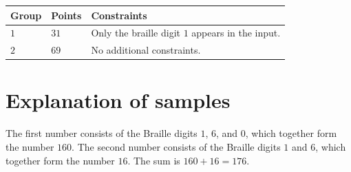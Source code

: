 \noindent
\begin{tabular}{| l | l | p{12cm} |}
  \hline
  \textbf{Group} & \textbf{Points} & \textbf{Constraints} \\ \hline
  $1$    & $31$      & Only the braille digit $1$ appears in the input. \\ \hline
  $2$    & $69$      & No additional constraints. \\ \hline
\end{tabular}

\section*{Explanation of samples}
The first number consists of the Braille digits $1$, $6$, and $0$, which together form the number $160$.
The second number consists of the Braille digits $1$ and $6$, which together form the number $16$.
The sum is $160 + 16 = 176$.
